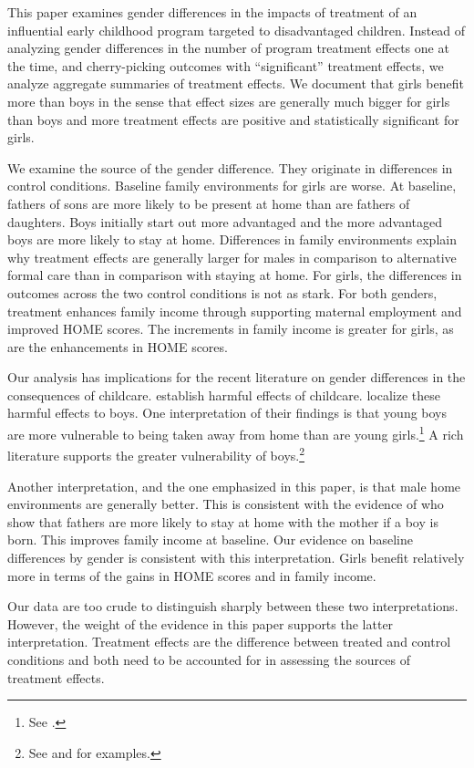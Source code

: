 This paper examines gender differences in the impacts of treatment of an influential early childhood program targeted to disadvantaged children. Instead of  analyzing gender differences in the number of program treatment effects one at the time, and cherry-picking outcomes with ``significant'' treatment effects, we analyze aggregate summaries of treatment effects. We document that girls benefit more than boys in the sense that effect sizes are generally much bigger for girls than boys and more treatment effects are positive and statistically significant for girls.

We examine the source of the gender difference. They originate in differences in control conditions. Baseline family environments for girls are worse. At baseline, fathers of sons are more likely to be present at home than are fathers of daughters. Boys initially start out more advantaged and the more advantaged boys are more likely to stay at home. Differences in family environments explain why treatment effects are generally larger for males in comparison to alternative formal care than in comparison with staying at home. For girls, the differences in outcomes across the two control conditions is not as stark. For both genders, treatment enhances family income through supporting maternal employment and improved HOME scores. The increments in family income is greater for girls, as are the enhancements in HOME scores.

Our analysis has implications for the recent literature on gender differences in the consequences of childcare. \citet{Baker_etal_2008_Universal_Childcare_JPE,Baker_Gruber_Milligan_2015_Noncog_Defects} establish harmful effects of childcare. \citet{Kottelenberg_Lehrer_2014_Gender-Effects} localize these harmful effects to boys. One interpretation of their findings is that young boys are more vulnerable to being taken away from home than are young girls.\footnote{See \citet{Garcia_etal_2019_ECE_IMHJ}.} A rich literature supports the greater vulnerability of boys.\footnote{See \citet{Golding_Fitzgerald_2017_IMHJ} and \citet{Schore_2017_IMHJ} for examples.}

Another interpretation, and the one emphasized in this paper, is that male home environments are generally better. This is consistent with the evidence of \citet{Dahl_Moretti_2008_RES} who show that fathers are more likely to stay at home with the mother if a boy is born. This improves family income at baseline. Our evidence on baseline differences by gender is consistent with this interpretation. Girls benefit relatively more in terms of the gains in HOME scores and in family income.

Our data are too crude to distinguish sharply between these two interpretations. However, the weight of the evidence in this paper supports the latter interpretation. Treatment effects are the difference between treated and control conditions and both need to be accounted for in assessing the sources of treatment effects. 